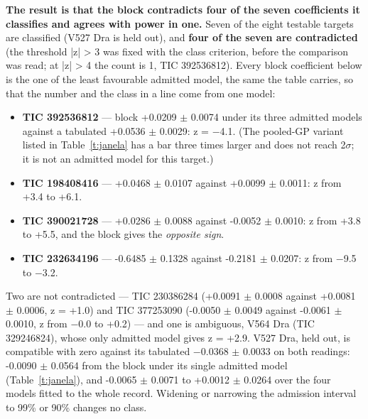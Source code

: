\documentclass{aa}
\begin{document}
\textbf{The result is that the block contradicts four of the seven coefficients it classifies and agrees with power in one.} Seven of the eight testable targets are classified (V527 Dra is held out), and \textbf{four of the seven are contradicted} (the threshold |z| > 3 was fixed with the class criterion, before the comparison was read; at |z| > 4 the count is 1, TIC 392536812). Every block coefficient below is the one of the least favourable admitted model, the same the table carries, so that the number and the class in a line come from one model:

\begin{itemize}
\item \textbf{TIC 392536812} --- block +0.0209 $\pm$ 0.0074 under its three admitted models against a tabulated +0.0536 $\pm$ 0.0029: z = $-$4.1. (The pooled-GP variant listed in Table~\ref{t:janela} has a bar three times larger and does not reach 2$\sigma$; it is not an admitted model for this target.)
\item \textbf{TIC 198408416} --- +0.0468 $\pm$ 0.0107 against +0.0099 $\pm$ 0.0011: z from +3.4 to +6.1.
\item \textbf{TIC 390021728} --- +0.0286 $\pm$ 0.0088 against -0.0052 $\pm$ 0.0010: z from +3.8 to +5.5, and the block gives the \textit{opposite sign}.
\item \textbf{TIC 232634196} --- -0.6485 $\pm$ 0.1328 against -0.2181 $\pm$ 0.0207: z from $-$9.5 to $-$3.2.
\end{itemize}

Two are not contradicted --- TIC 230386284 (+0.0091 $\pm$ 0.0008 against +0.0081 $\pm$ 0.0006, z = +1.0) and TIC 377253090 (-0.0050 $\pm$ 0.0049 against -0.0061 $\pm$ 0.0010, z from $-$0.0 to +0.2) --- and one is ambiguous, V564 Dra (TIC 329246824), whose only admitted model gives z = +2.9. V527 Dra, held out, is compatible with zero against its tabulated $-$0.0368 $\pm$ 0.0033 on both readings: -0.0090 $\pm$ 0.0564 from the block under its single admitted model (Table~\ref{t:janela}), and -0.0065 $\pm$ 0.0071 to +0.0012 $\pm$ 0.0264 over the four models fitted to the whole record. Widening or narrowing the admission interval to 99\% or 90\% changes no class.
\end{document}
